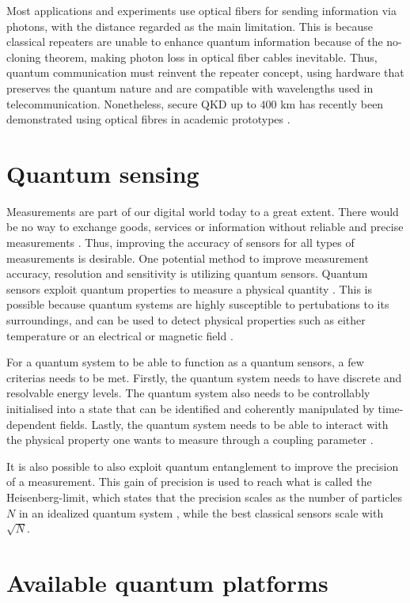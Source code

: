Most applications and experiments use optical fibers for sending information via photons, with the distance regarded as the main limitation. This is because classical repeaters are unable to enhance quantum information because of the no-cloning theorem, making photon loss in optical fiber cables inevitable. Thus, quantum communication must reinvent the repeater concept, using hardware that preserves the quantum nature \cite{Acin2018} and are compatible with wavelengths used in telecommunication. Nonetheless, secure QKD up to $400$ km has recently been demonstrated using optical fibres in academic prototypes \cite{Boaron2018}.

\section{Quantum sensing}

Measurements are part of our digital world today to a great extent. There would be no way to exchange goods, services or information without reliable and precise measurements \cite{Acin2018}. Thus, improving the accuracy of sensors for all types of measurements is desirable. One potential method to improve measurement accuracy, resolution and sensitivity is utilizing quantum sensors. Quantum sensors exploit quantum properties to measure a physical quantity \cite{Degen2017}. This is possible because quantum systems are highly susceptible to pertubations to its surroundings, and can be used to detect physical properties such as either temperature or an electrical or magnetic field \cite{Degen2017}.

For a quantum system to be able to function as a quantum sensors, a few criterias needs to be met.  Firstly, the quantum system needs to have discrete and resolvable energy levels. The quantum system also needs to be controllably initialised into a state that can be identified and coherently manipulated by time-dependent fields. Lastly, the quantum system needs to be able to interact with the physical property one wants to measure through a coupling parameter \cite{Degen2017}.

It is also possible to also exploit quantum entanglement to improve the precision of a measurement. This gain of precision is used to reach what is called the Heisenberg-limit, which states that the precision scales as the number of particles $N$ in an idealized quantum system \cite{Degen2017, Acin2018}, while the best classical sensors scale with $\sqrt{N}$.

\section{Available quantum platforms}

